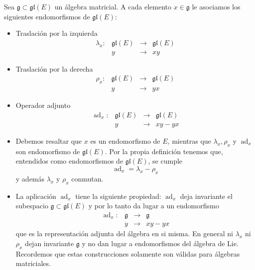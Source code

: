 \documentclass[a4paper,draft,12pt]{scrartcl}
\newcommand{\g}{\mathfrak{g}}%
\newcommand{\lto}{\longrightarrow}%
\DeclareMathOperator{\ad}{ad}  %
\begin{document}
Sea $\g \subset \mathfrak{gl}(E)$ un álgebra matricial.  A cada elemento $x \in \g$ le asociamos los siguientes endomorfismos de $\mathfrak{gl}(E)$:
\begin{itemize}

\item Traslación por la izquierda
$$
\begin{array}{lccc}
\lambda_x :& \mathfrak{gl}(E)& \lto &\mathfrak{gl}(E)\\
           &  y  & \lto & xy
\end{array}
$$

 \item Traslación por la derecha
$$
\begin{array}{lccc}
\rho_x :& \mathfrak{gl}(E) &\lto &\mathfrak{gl}(E)\\
           &  y  & \lto & yx
\end{array}
$$

\item Operador adjunto
$$
\begin{array}{lccc}
\ad_x :& \mathfrak{gl}(E) &\lto &\mathfrak{gl}(E)\\
           &  y  & \lto & xy-yx
\end{array}
$$
\end{itemize}




\begin{itemize}

\item  Debemos resaltar que $x$ es un endomorfismo de $E$, mientras que $\lambda_x,\rho_x$ y $\ad_x$ son endomorfismo de $\mathfrak{gl}(E)$. Por la propia definición tenemos que, entendidos como endomorfismos de $\mathfrak{gl}(E)$, se cumple
$$
\ad_x = \lambda_x -\rho_x
$$
y además $\lambda_x$ y $\rho_x$ conmutan.

\item La aplicación $\ad_x$ tiene la siguiente propiedad: $\ad_x$ deja invariante el subespacio $\g \subset \mathfrak{gl}(E)$ y por lo tanto da lugar a un endomorfismo
$$
\begin{array}{lccc}
\ad_x :& \g &\lto &\g\\
           &  y  & \lto & xy-yx
\end{array}
$$
que es la representación adjunta del álgebra en si misma.
 En general ni $\lambda_x$ ni $\rho_x$ dejan invariante $\g$ y  no dan lugar a endomorfismos del álgebra de Lie.  Recordemos que estas construcciones solamente son válidas para álgebras matriciales.


\end{itemize}
\end{document}
